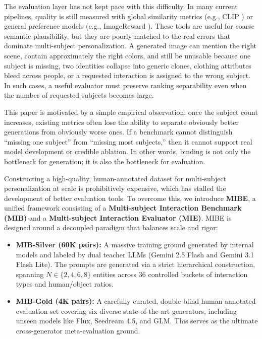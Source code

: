 \documentclass{article}
\begin{document}
The evaluation layer has not kept pace with this difficulty. In many current pipelines, quality is still measured with global similarity metrics (e.g., CLIP \cite{radford2021learning}) or general preference models (e.g., ImageReward \cite{xu2023imagereward}). These tools are useful for coarse semantic plausibility, but they are poorly matched to the real errors that dominate multi-subject personalization. A generated image can mention the right scene, contain approximately the right colors, and still be unusable because one subject is missing, two identities collapse into generic clones, clothing attributes bleed across people, or a requested interaction is assigned to the wrong subject. In such cases, a useful evaluator must preserve ranking separability even when the number of requested subjects becomes large.

This paper is motivated by a simple empirical observation: once the subject count increases, existing metrics often lose the ability to separate obviously better generations from obviously worse ones. If a benchmark cannot distinguish ``missing one subject'' from ``missing most subjects,'' then it cannot support real model development or credible ablation. In other words, binding is not only the bottleneck for generation; it is also the bottleneck for evaluation.

Constructing a high-quality, human-annotated dataset for multi-subject personalization at scale is prohibitively expensive, which has stalled the development of better evaluation tools. To overcome this, we introduce \textbf{MIBE}, a unified framework consisting of a \textbf{Multi-subject Interaction Benchmark (MIB)} and a \textbf{Multi-subject Interaction Evaluator (MIE)}. MIBE is designed around a decoupled paradigm that balances scale and rigor:

\begin{itemize}
    \item \textbf{MIB-Silver (60K pairs):} A massive training ground generated by internal models and labeled by dual teacher LLMs (Gemini 2.5 Flash and Gemini 3.1 Flash Lite). The prompts are generated via a strict hierarchical construction, spanning $N \in \{2,4,6,8\}$ entities across 36 controlled buckets of interaction types and human/object ratios.
    \item \textbf{MIB-Gold (4K pairs):} A carefully curated, double-blind human-annotated evaluation set covering six diverse state-of-the-art generators, including unseen models like Flux, Seedream 4.5, and GLM. This serves as the ultimate cross-generator meta-evaluation ground.
\end{itemize}
\end{document}
